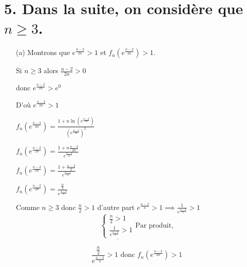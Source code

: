 \documentclass[12pt]{article}
\begin{document}
\section*{5. Dans la suite, on considère que $n\geq 3$.}
\begin{itemize}
\item[(a)] Montrons que $ e^{\frac{n-2}{2n}} > 1 $ et $f_{n}(e^{\frac{n-2}{2n}}) > 1$.

Si $n\geq 3$ alors $\frac{n-2}{2n}>0$

donc $ e^{\frac{n-2}{2n}} > e^{0} $

D'où $ e^{\frac{n-2}{2n}} > 1 $

$f_n(e^{\frac{n-2}{2n}}) = \frac{1 + n \ln \left( e^{\frac{n-2}{2n}}\right)}{\left( e^{\frac{n-2}{2n}}\right) ^2}$

$f_n(e^{\frac{n-2}{2n}}) = \frac{1 + n\frac{n-2}{2n}}{e^{\frac{n-2}{n}}}$

$f_n(e^{\frac{n-2}{2n}}) = \frac{1 + \frac{n-2}{2}}{e^{\frac{n-2}{n}}}$

$f_n(e^{\frac{n-2}{2n}}) = \frac{\frac{n}{2}}{e^{\frac{n-2}{n}}}$

Comme $n\geq 3$ donc $\frac{n}{2}>1$ d'autre part $e^{\frac{n-2}{n}}>1\implies \frac{1}{e^{\frac{n-2}{n}}}>1$ 
\[
\underline{
\begin{cases}
\frac{n}{2}>1\\
\frac{1}{e^{\frac{n-2}{n}}}>1
\end{cases}}
\text{Par produit,}
\]

\[
\frac{\frac{n}{2}}{e^{\frac{n-2}{n}}}>1 \text{ donc } f_n(e^{\frac{n-2}{2n}})>1
\]
\end{itemize}
\end{document}
